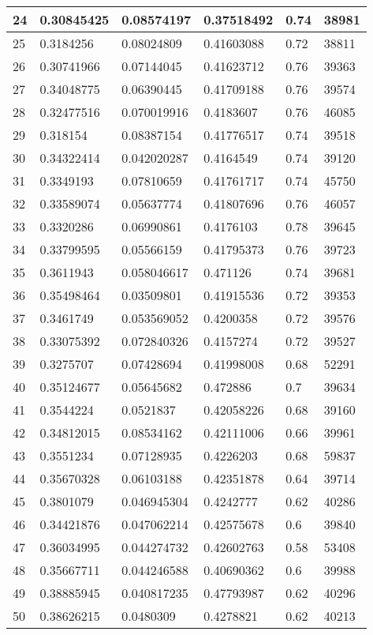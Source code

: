\begin{longtable}{|l|l|l|l|l|l|}
24 & 0.30845425 & 0.08574197 & 0.37518492 & 0.74 & 38981 \\ \hline 
25 & 0.3184256 & 0.08024809 & 0.41603088 & 0.72 & 38811 \\ \hline 
26 & 0.30741966 & 0.07144045 & 0.41623712 & 0.76 & 39363 \\ \hline 
27 & 0.34048775 & 0.06390445 & 0.41709188 & 0.76 & 39574 \\ \hline 
28 & 0.32477516 & 0.070019916 & 0.4183607 & 0.76 & 46085 \\ \hline 
29 & 0.318154 & 0.08387154 & 0.41776517 & 0.74 & 39518 \\ \hline 
30 & 0.34322414 & 0.042020287 & 0.4164549 & 0.74 & 39120 \\ \hline 
31 & 0.3349193 & 0.07810659 & 0.41761717 & 0.74 & 45750 \\ \hline 
32 & 0.33589074 & 0.05637774 & 0.41807696 & 0.76 & 46057 \\ \hline 
33 & 0.3320286 & 0.06990861 & 0.4176103 & 0.78 & 39645 \\ \hline 
34 & 0.33799595 & 0.05566159 & 0.41795373 & 0.76 & 39723 \\ \hline 
35 & 0.3611943 & 0.058046617 & 0.471126 & 0.74 & 39681 \\ \hline 
36 & 0.35498464 & 0.03509801 & 0.41915536 & 0.72 & 39353 \\ \hline 
37 & 0.3461749 & 0.053569052 & 0.4200358 & 0.72 & 39576 \\ \hline 
38 & 0.33075392 & 0.072840326 & 0.4157274 & 0.72 & 39527 \\ \hline 
39 & 0.3275707 & 0.07428694 & 0.41998008 & 0.68 & 52291 \\ \hline 
40 & 0.35124677 & 0.05645682 & 0.472886 & 0.7 & 39634 \\ \hline 
41 & 0.3544224 & 0.0521837 & 0.42058226 & 0.68 & 39160 \\ \hline 
42 & 0.34812015 & 0.08534162 & 0.42111006 & 0.66 & 39961 \\ \hline 
43 & 0.3551234 & 0.07128935 & 0.4226203 & 0.68 & 59837 \\ \hline 
44 & 0.35670328 & 0.06103188 & 0.42351878 & 0.64 & 39714 \\ \hline 
45 & 0.3801079 & 0.046945304 & 0.4242777 & 0.62 & 40286 \\ \hline 
46 & 0.34421876 & 0.047062214 & 0.42575678 & 0.6 & 39840 \\ \hline 
47 & 0.36034995 & 0.044274732 & 0.42602763 & 0.58 & 53408 \\ \hline 
48 & 0.35667711 & 0.044246588 & 0.40690362 & 0.6 & 39988 \\ \hline 
49 & 0.38885945 & 0.040817235 & 0.47793987 & 0.62 & 40296 \\ \hline 
50 & 0.38626215 & 0.0480309 & 0.4278821 & 0.62 & 40213 \\ \hline 
\end{longtable}